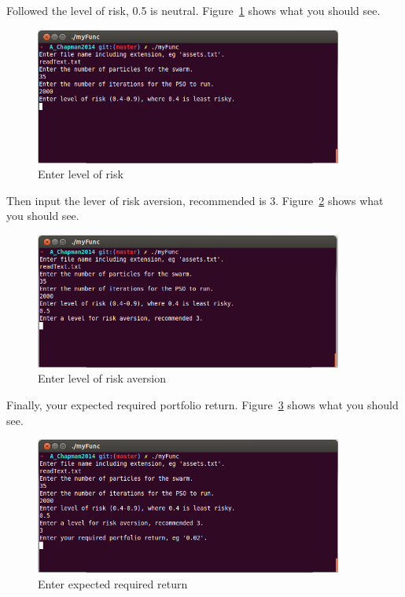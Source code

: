\documentclass{pdfmx4020}
\begin{document}
Followed the level of risk, 0.5 is neutral. Figure~\ref{fig:risk} shows what you should see. 
\begin{figure}[H]
  \centering
    \includegraphics[width=0.9\textwidth]{risk}
  \caption{Enter level of risk}
  \label{fig:risk}
\end{figure}
Then input the lever of risk aversion, recommended is 3. Figure~\ref{fig:aversion} shows what you should see. 
\begin{figure}[H]
  \centering
    \includegraphics[width=0.9\textwidth]{aversion}
  \caption{Enter level of risk aversion}
  \label{fig:aversion}
\end{figure}
Finally, your expected required portfolio return. Figure~\ref{fig:portReq} shows what you should see. 
\begin{figure}[H]
  \centering
    \includegraphics[width=0.9\textwidth]{portReq}
  \caption{Enter expected required return}
  \label{fig:portReq}
\end{figure} 
\end{document}

